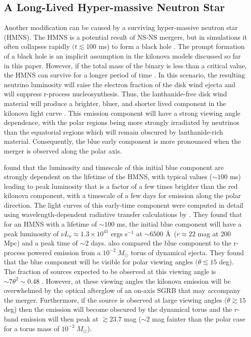 \subsection{A Long-Lived Hyper-massive Neutron Star}
\label{sec:ch2_HMNS}
Another modification can be caused by a  surviving hyper-massive neutron star (HMNS). The HMNS is a potential result of NS-NS mergers, but in simulations it often collapses rapidly $(t \lesssim 100$ ms) to form a black hole \citep{Sekiguchi+11}. The prompt formation of a black hole is an implicit assumption in the kilonova models discussed so far in this paper. However, if the total mass of the binary is less than a critical value, the HMNS can survive for a longer period of time \citep{Bauswein+13a,Kaplan+14}. In this scenario, the resulting neutrino luminosity will raise the electron fraction of the disk wind ejecta and will suppress r-process nucleosynthesis. Thus, the lanthanide-free disk wind material will produce a brighter, bluer, and shorter lived component in the kilonova light curve \citep[see e.g.,][and references therein]{MetzgerPiro14,MetzgerFernandez14}. This emission component will have a strong viewing angle dependence, with the polar regions being more strongly irradiated by neutrinos than the equatorial regions which will remain obscured by lanthanide-rich material. Consequently, the blue early component is more pronounced when the merger is observed along the polar axis.

\citet{MetzgerFernandez14} found that the luminosity and timescale of this initial blue component are strongly dependent on the lifetime of the HMNS, with typical values ($\sim 100$ ms) leading to peak luminosity that is a factor of a few times brighter than the red kilonova component, with a timescale of a few days for emission along the polar direction. The light curves of this early-time component were computed in detail using wavelength-dependent radiative transfer calculations by \citet{Kasen+15}. They found that for an HMNS with a lifetime of $\sim100$ ms, the initial blue component will have a peak luminosity of $\nu L_{\nu} \approx 1.3\times10^{41}$ ergs s$^{-1}$ at $\sim6500$ \AA\,  ($r \approx 22$ mag at 200 Mpc) and a peak time of $\sim2$ days. \citet{Kasen+15} also compared the blue component to the r-process powered emission from a $10^{-2}\;M_{\odot}$ torus of dynamical ejecta. They found that the blue component will be visible for polar viewing angles $(\theta \lesssim 15$ deg). The fraction of sources expected to be observed at this viewing angle is $\sim7\theta^2\sim0.48$ \citep{MetzgerBerger12}. However, at these viewing angles the kilonova emission will be overwhelmed by the optical afterglow of an on-axis SGRB that may accompany the merger. Furthermore, if the source is observed at large viewing angles $(\theta \gtrsim 15$ deg) then the emission will become obscured by the dynamical torus and the $r$-band emission will then peak at $\gtrsim 23.7$ mag ($\sim2$ mag fainter than the polar case for a torus mass of $10^{-2}\;M_{\odot}$).

